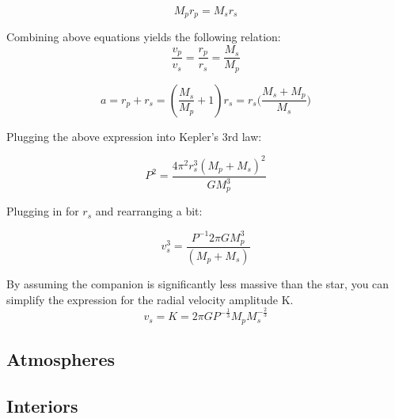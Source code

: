 \begin{equation}
M_pr_p = M_sr_s
\end{equation}

Combining above equations yields the following relation:
\begin{equation}
\frac{v_p}{v_s} = \frac{r_p}{r_s} = \frac{M_s}{M_p}
\end{equation} 

\begin{equation}
a = r_p + r_s = (\frac{M_s}{M_p} + 1)r_s = r_s\big(\frac{M_s + M_p}{M_s}\big)
\end{equation}

Plugging the above expression into Kepler's 3rd law:

\begin{equation}
P^2 = \frac{4\pi^2r_s^3(M_p + M_s)^2}{GM_p^3}
\end{equation}

Plugging in for $r_s$ and rearranging a bit:

\begin{equation}
v_s^3 = \frac{P^{-1}2\pi GM_p^3}{(M_p + M_s)}
\end{equation}

By assuming the companion is significantly less massive than the star, you can simplify the expression for the radial velocity amplitude K.  
\begin{equation}
v_s = K = 2\pi G P^{-\frac{1}{3}}M_pM_s^{-\frac{2}{3}}
\end{equation}

\subsection{Atmospheres}
\subsection{Interiors}






